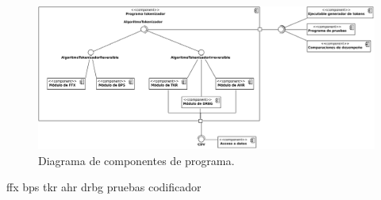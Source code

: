 \begin{figure}
  \begin{center}
    \includegraphics[width=1.0\linewidth]
      {../../../../diagramas_comunes/disenio/componentes.png}
    \caption{Diagrama de componentes de programa.}
    \label{componentes_general}
  \end{center}
\end{figure}

{ffx}
{bps}
{tkr}
{ahr}
{drbg}
{pruebas}
{codificador}
